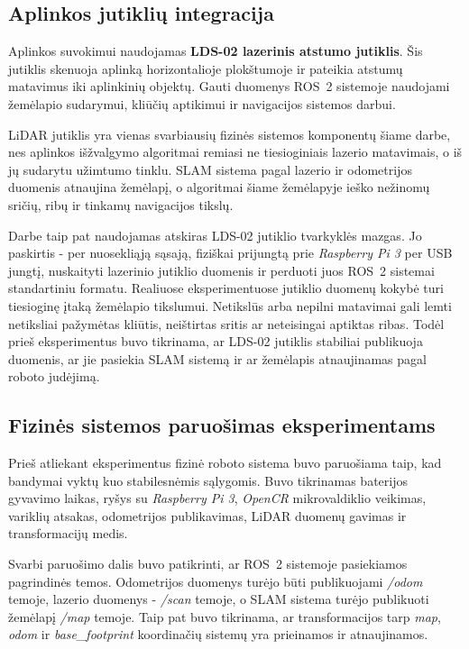 \documentclass[]{VUMIFTemplateClass}
\begin{document}
\subsection{Aplinkos jutiklių integracija}

Aplinkos suvokimui naudojamas \textbf{LDS-02 lazerinis atstumo jutiklis}. Šis jutiklis skenuoja aplinką horizontalioje plokštumoje ir pateikia atstumų matavimus iki
aplinkinių objektų. Gauti duomenys ROS~2 sistemoje naudojami žemėlapio sudarymui, kliūčių aptikimui ir navigacijos sistemos darbui.

LiDAR jutiklis yra vienas svarbiausių fizinės sistemos komponentų šiame darbe, nes aplinkos išžvalgymo algoritmai remiasi ne tiesioginiais lazerio
matavimais, o iš jų sudarytu užimtumo tinklu. SLAM sistema pagal lazerio ir odometrijos duomenis atnaujina žemėlapį, o algoritmai šiame žemėlapyje ieško
nežinomų sričių, ribų ir tinkamų navigacijos tikslų.

Darbe taip pat naudojamas atskiras LDS-02 jutiklio tvarkyklės mazgas. Jo paskirtis - per nuosekliąją sąsają, fiziškai prijungtą prie \textit{Raspberry Pi 3}
per USB jungtį, nuskaityti lazerinio jutiklio duomenis ir perduoti juos ROS~2 sistemai standartiniu formatu.
Realiuose eksperimentuose jutiklio duomenų kokybė turi tiesioginę įtaką žemėlapio tikslumui. Netikslūs arba nepilni matavimai gali lemti netiksliai pažymėtas
kliūtis, neištirtas sritis ar neteisingai aptiktas ribas. Todėl prieš eksperimentus buvo tikrinama, ar LDS-02 jutiklis stabiliai publikuoja duomenis, ar jie
pasiekia SLAM sistemą ir ar žemėlapis atnaujinamas pagal roboto judėjimą.

\subsection{Fizinės sistemos paruošimas eksperimentams}

Prieš atliekant eksperimentus fizinė roboto sistema buvo paruošiama taip, kad bandymai vyktų kuo stabilesnėmis sąlygomis. Buvo tikrinamas baterijos gyvavimo laikas, ryšys su \textit{Raspberry Pi 3}, \textit{OpenCR} mikrovaldiklio veikimas, variklių atsakas, odometrijos publikavimas, LiDAR duomenų gavimas ir
transformacijų medis.

Svarbi paruošimo dalis buvo patikrinti, ar ROS~2 sistemoje pasiekiamos pagrindinės temos. Odometrijos duomenys turėjo būti publikuojami \textit{/odom}
temoje, lazerio duomenys - \textit{/scan} temoje, o SLAM sistema turėjo publikuoti žemėlapį \textit{/map} temoje. Taip pat buvo tikrinama, ar transformacijos
tarp \textit{map}, \textit{odom} ir \textit{base\_footprint} koordinačių sistemų yra prieinamos ir atnaujinamos.
\end{document}
